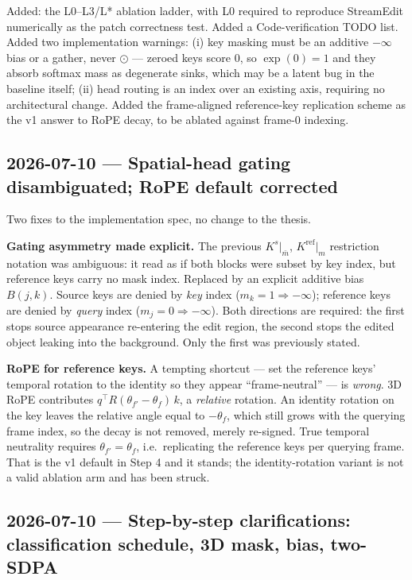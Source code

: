 \documentclass{article}
\begin{document}
Added: the L0--L3/L* ablation ladder, with L0 required to reproduce StreamEdit
numerically as the patch correctness test. Added a Code-verification TODO list.
Added two implementation warnings: (i) key masking must be an additive $-\infty$
bias or a gather, never $\odot$ --- zeroed keys score $0$, so $\exp(0)=1$ and
they absorb softmax mass as degenerate sinks, which may be a latent bug in the
baseline itself; (ii) head routing is an index over an existing axis, requiring
no architectural change. Added the frame-aligned reference-key replication scheme
as the v1 answer to RoPE decay, to be ablated against frame-$0$ indexing.

\subsection*{2026-07-10 --- Spatial-head gating disambiguated; RoPE default corrected}

Two fixes to the implementation spec, no change to the thesis.

\textbf{Gating asymmetry made explicit.} The previous $K^{s}|_{\bar m}$,
$K^{\mathrm{ref}}|_{m}$ restriction notation was ambiguous: it read as if both
blocks were subset by key index, but reference keys carry no mask index. Replaced
by an explicit additive bias $B(j,k)$. Source keys are denied by \emph{key} index
($m_k = 1 \Rightarrow -\infty$); reference keys are denied by \emph{query} index
($m_j = 0 \Rightarrow -\infty$). Both directions are required: the first stops
source appearance re-entering the edit region, the second stops the edited object
leaking into the background. Only the first was previously stated.

\textbf{RoPE for reference keys.} A tempting shortcut --- set the reference keys'
temporal rotation to the identity so they appear ``frame-neutral'' --- is
\emph{wrong}. 3D RoPE contributes $q^{\top} R(\theta_{f'} - \theta_{f})\,k$, a
\emph{relative} rotation. An identity rotation on the key leaves the relative
angle equal to $-\theta_f$, which still grows with the querying frame index, so
the decay is not removed, merely re-signed. True temporal neutrality requires
$\theta_{f'} = \theta_{f}$, i.e.\ replicating the reference keys per querying
frame. That is the v1 default in Step 4 and it stands; the identity-rotation
variant is not a valid ablation arm and has been struck.

\subsection*{2026-07-10 --- Step-by-step clarifications: classification schedule, 3D mask, bias, two-SDPA}
\end{document}
